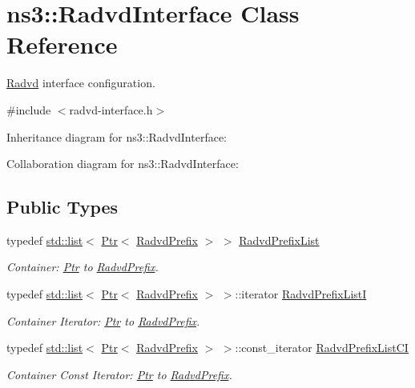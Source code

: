 \hypertarget{classns3_1_1RadvdInterface}{}\section{ns3\+:\+:Radvd\+Interface Class Reference}
\label{classns3_1_1RadvdInterface}


\hyperlink{classns3_1_1Radvd}{Radvd} interface configuration.  




{\ttfamily \#include $<$radvd-\/interface.\+h$>$}



Inheritance diagram for ns3\+:\+:Radvd\+Interface\+:


Collaboration diagram for ns3\+:\+:Radvd\+Interface\+:
\subsection*{Public Types}
\begin{DoxyCompactItemize}
\item 
typedef \hyperlink{openflow-interface_8h_afd9bcfa176617760671b67580f536fa7}{std\+::list}$<$ \hyperlink{classns3_1_1Ptr}{Ptr}$<$ \hyperlink{classns3_1_1RadvdPrefix}{Radvd\+Prefix} $>$ $>$ \hyperlink{classns3_1_1RadvdInterface_a25f72232730563f395b822cf912e9f5e}{Radvd\+Prefix\+List}
\begin{DoxyCompactList}\small\item\em Container\+: \hyperlink{classns3_1_1Ptr}{Ptr} to \hyperlink{classns3_1_1RadvdPrefix}{Radvd\+Prefix}. \end{DoxyCompactList}\item 
typedef \hyperlink{openflow-interface_8h_afd9bcfa176617760671b67580f536fa7}{std\+::list}$<$ \hyperlink{classns3_1_1Ptr}{Ptr}$<$ \hyperlink{classns3_1_1RadvdPrefix}{Radvd\+Prefix} $>$ $>$\+::iterator \hyperlink{classns3_1_1RadvdInterface_a48daa1623aa945676799f13faf872808}{Radvd\+Prefix\+ListI}
\begin{DoxyCompactList}\small\item\em Container Iterator\+: \hyperlink{classns3_1_1Ptr}{Ptr} to \hyperlink{classns3_1_1RadvdPrefix}{Radvd\+Prefix}. \end{DoxyCompactList}\item 
typedef \hyperlink{openflow-interface_8h_afd9bcfa176617760671b67580f536fa7}{std\+::list}$<$ \hyperlink{classns3_1_1Ptr}{Ptr}$<$ \hyperlink{classns3_1_1RadvdPrefix}{Radvd\+Prefix} $>$ $>$\+::const\+\_\+iterator \hyperlink{classns3_1_1RadvdInterface_a909765e6a9cf829194d2db99c2fb041d}{Radvd\+Prefix\+List\+CI}
\begin{DoxyCompactList}\small\item\em Container Const Iterator\+: \hyperlink{classns3_1_1Ptr}{Ptr} to \hyperlink{classns3_1_1RadvdPrefix}{Radvd\+Prefix}. \end{DoxyCompactList}\end{DoxyCompactItemize}

